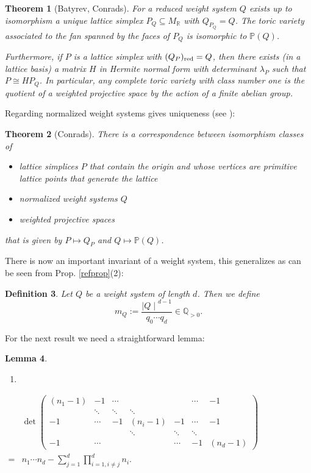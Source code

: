 \documentclass[a4paper,twoside]{article}
\newcommand{\card}[1]{{\mid\! #1 \!\mid}}
\def\P{{\mathbb P}}
\def\Q{{\mathbb Q}}
\def\R{{\mathbb R}}
\def\red{{\rm red}}
\def\MR{{M_{\R}}}
\newtheorem{theorem}{Theorem}[section]
\newtheorem{definition}[theorem]{Definition}
\newtheorem{lemma}[theorem]{Lemma}
\begin{document}
\begin{theorem}[Batyrev, Conrads]
For a reduced weight system $Q$ exists up to isomorphism a unique lattice simplex $P_Q \subseteq \MR$ with $Q_{P_Q} = Q$. 
The toric variety associated to the fan spanned by the faces of $P_Q$ is isomorphic to $\P(Q)$.

Furthermore, if $P$ is a lattice simplex with $(Q_P)_\red = Q$, then there exists (in a lattice basis) 
a matrix $H$ in Hermite normal form with determinant $\lambda_P$ such that $P \cong H P_Q$. 
In particular, any complete toric variety with class number one is the quotient of a weighted projective space 
by the action of a finite abelian group.
\label{maps}
\end{theorem}

Regarding normalized weight systems gives uniqueness (see \cite[3.7,3.8]{Con02}):

\begin{theorem}[Conrads]
There is a correspondence between isomorphism classes of
\begin{itemize}
\item lattice simplices $P$ that contain the origin and whose vertices are primitive lattice points that 
generate the lattice
\item normalized weight systems $Q$
\item weighted projective spaces
\end{itemize}
that is given by $P \mapsto Q_P$ and $Q \mapsto \P(Q)$.
\label{mainweight}
\end{theorem}

\smallskip

There is now an important invariant of a weight system, this generalizes \cite[Def. 5.4]{Con02} 
as can be seen from Prop. \ref{refprop}(2):

\begin{definition}{\rm 
Let $Q$ be a weight system of length $d$. Then we define
\[m_Q := \frac{\card{Q}^{d-1}}{q_0 \cdots q_d} \in \Q_{>0}.\]
}\label{mqdef}
\end{definition}

For the next result we need a straightforward lemma:

\begin{lemma}

\begin{enumerate}
\item[]
\end{enumerate}
$\begin{array}{ll}
&\det\begin{pmatrix}(n_1 - 1) & -1 & \cdots & & & \cdots & -1 \\
&\ddots&\ddots&\ddots&&&\\
-1 & \cdots & -1 & (n_i - 1) & -1 & \cdots & -1\\
&&&\ddots&\ddots&\ddots&\\
-1 & \cdots & & & \cdots & -1 & (n_d -1)
\end{pmatrix}\\
= & n_1 \cdots n_d  - \sum_{j=1}^d \prod_{i=1, i\not=j}^d n_i.
\end{array}$

\label{detformel*}
\end{lemma}
\end{document}
